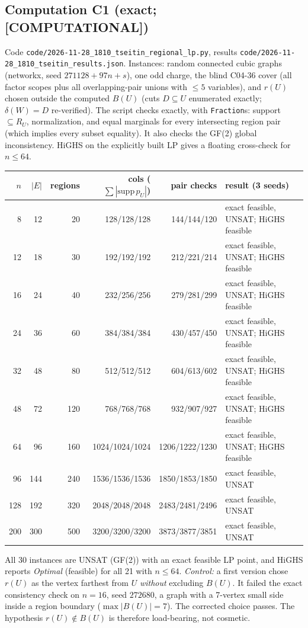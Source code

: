 \documentclass[11pt]{article}
\theoremstyle{remark}
\newcommand{\lab}[1]{\textbf{[#1]}}
\begin{document}
\subsection{Computation C1 (exact; \lab{COMPUTATIONAL})}
Code \texttt{code/2026-11-28\_1810\_tseitin\_regional\_lp.py}, results \texttt{code/2026-11-28\_1810\_tseitin\_results.json}.
Instances: random connected cubic graphs (networkx, seed $271128+97n+s$), one odd charge, the
blind C04-36 cover (all factor scopes plus all overlapping-pair unions with $\le5$ variables), and
$r(U)$ chosen outside the computed $B(U)$ (cuts $D\subseteq U$ enumerated exactly; $\delta(W)=D$
re-verified). The script checks exactly, with \texttt{Fraction}s: support $\subseteq R_U$, normalization, and equal
marginals for every intersecting region pair (which implies every subset equality). It also checks the GF(2) global
inconsistency. HiGHS on the explicitly built LP gives a floating cross-check for $n\le 64$.
\begin{center}\begin{tabular}{rrrrrl}\toprule
$n$ & $|E|$ & regions & cols ($\sum|\mathrm{supp}\,p_U|$) & pair checks & result (3 seeds)\\\midrule
8 & 12 & 20 & 128/128/128 & 144/144/120 & exact feasible, UNSAT; HiGHS feasible\\
12 & 18 & 30 & 192/192/192 & 212/221/214 & exact feasible, UNSAT; HiGHS feasible\\
16 & 24 & 40 & 232/256/256 & 279/281/299 & exact feasible, UNSAT; HiGHS feasible\\
24 & 36 & 60 & 384/384/384 & 430/457/450 & exact feasible, UNSAT; HiGHS feasible\\
32 & 48 & 80 & 512/512/512 & 604/613/602 & exact feasible, UNSAT; HiGHS feasible\\
48 & 72 & 120 & 768/768/768 & 932/907/927 & exact feasible, UNSAT; HiGHS feasible\\
64 & 96 & 160 & 1024/1024/1024 & 1206/1222/1230 & exact feasible, UNSAT; HiGHS feasible\\
96 & 144 & 240 & 1536/1536/1536 & 1850/1853/1850 & exact feasible, UNSAT\\
128 & 192 & 320 & 2048/2048/2048 & 2483/2481/2496 & exact feasible, UNSAT\\
200 & 300 & 500 & 3200/3200/3200 & 3873/3877/3851 & exact feasible, UNSAT\\
\bottomrule\end{tabular}\end{center}
All 30 instances are UNSAT (GF(2)) with an exact feasible LP point, and HiGHS reports \emph{Optimal} (feasible) for all
21 with $n\le64$. \emph{Control:} a first version chose $r(U)$ as the vertex farthest from $U$
\emph{without} excluding $B(U)$. It failed the exact consistency check on $n=16$, seed $272680$, a graph with a
7-vertex small side inside a region boundary ($\max|B(U)|=7$). The corrected choice passes. The
hypothesis $r(U)\notin B(U)$ is therefore load-bearing, not cosmetic.
\end{document}
